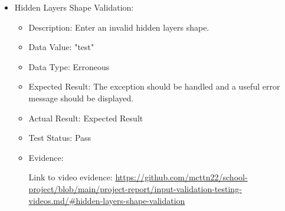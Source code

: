 \documentclass[./project-report/src/latex/project-report.tex]{subfiles}
\begin{document}
\begin{itemize}
\begin{itemize}
        \item Hidden Layers Shape Validation:
            \begin{itemize}
                \item Description: Enter an invalid hidden layers shape.
                \item Data Value: "test"
                \item Data Type: Erroneous
                \item Expected Result: The exception should be handled and a useful error message should be displayed.
                \item Actual Result: Expected Result
                \item Test Status: Pass
                \item Evidence:
                    \begin{figure}[h!]
                    \centering
                    \end{figure}

                    Link to video evidence: \url{https://github.com/mcttn22/school-project/blob/main/project-report/input-validation-testing-videos.md/#hidden-layers-shape-validation}
            \end{itemize}
    \end{itemize}

    \pagebreak


\end{itemize}
\end{document}
